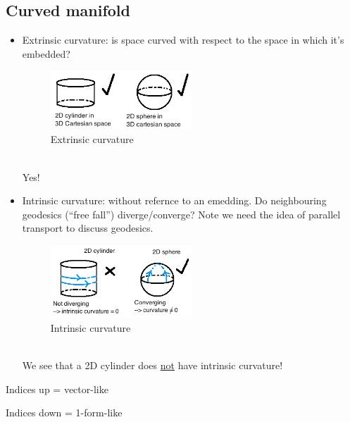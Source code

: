\documentclass[a4paper]{article} %
\begin{document}
\subsection{Curved manifold}
\begin{itemize}
\item Extrinsic curvature: is space curved with respect to the space in which it's embedded?
\begin{figure}[h]
\centering
\includegraphics[width=0.5\textwidth]{images/extrinsic-curvature.png}
\caption{Extrinsic curvature}
\end{figure}\\
Yes!
\item Intrinsic curvature: without refernce to an emedding. Do neighbouring geodesics (``free fall'') diverge/converge? Note we need the idea of parallel transport to discuss geodesics.
\begin{figure}[h]
\centering
\includegraphics[width=0.5\textwidth]{images/intrinsic-curvature.png}
\caption{Intrinsic curvature}
\end{figure}\\
We see that a 2D cylinder does \underline{not} have intrinsic curvature!
\end{itemize}


\pagebreak



Indices up = vector-like

Indices down = 1-form-like

\end{document}
